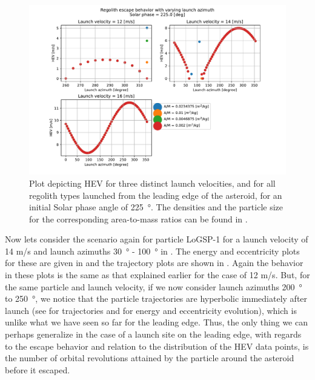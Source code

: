 \begin{figure}[!h]
\centering
\captionsetup{justification=centering}
\includegraphics[width=\textwidth, height=0.5\textheight, keepaspectratio=true]{leading_edge_perturbations/hev_255solarPhase.pdf}
\caption{Plot depicting \gls{HEV} for three distinct launch velocities, and for all regolith types launched from the leading edge of the asteroid, for an initial Solar phase angle of \SI{225}{\degree}. The densities and the particle size for the corresponding area-to-mass ratios can be found in .}
\label{fig:leadingEdge_allParticles_hev_225solarPhase}
\end{figure}
\FloatBarrier
Now lets consider the scenario again for particle LoGSP-1 for a launch velocity of 14 m/s and launch azimuths \SI{30}{\degree} - \SI{100}{\degree} in . The energy and eccentricity plots for these are given in  and the trajectory plots are shown in . Again the behavior in these plots is the same as that explained earlier for the case of 12 m/s. But, for the same particle and launch velocity, if we now consider launch azimuths \SI{200}{\degree} to \SI{250}{\degree}, we notice that the particle trajectories are hyperbolic immediately after launch (see  for trajectories and  for energy and eccentricity evolution), which is unlike what we have seen so far for the leading edge. Thus, the only thing we can perhaps generalize in the case of a launch site on the leading edge, with regards to the escape behavior and relation to the distribution of the \gls{HEV} data points, is the number of orbital revolutions attained by the particle around the asteroid before it escaped.
